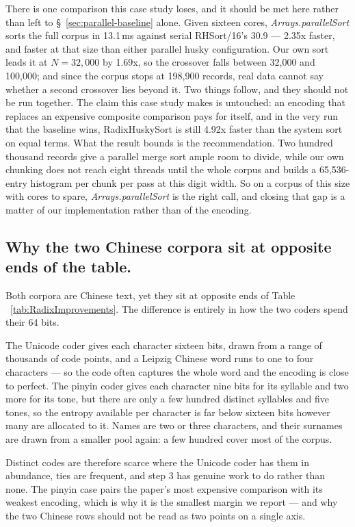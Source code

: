 \documentclass[twoside,leqno,twocolumn]{article}
\begin{document}
There is one comparison this case study loses, and it should be met here rather than left to
\S~\ref{sec:parallel-baseline} alone.
Given sixteen cores, \mbox{\textit{Arrays.parallelSort}} sorts the full corpus in 13.1\,ms against serial
RHSort/16's 30.9 --- 2.35x faster, and faster at that size than either parallel husky configuration.
Our own sort leads it at $N = 32{,}000$ by 1.69x, so the crossover falls between 32,000 and 100,000;
and since the corpus stops at 198,900 records, real data cannot say whether a second crossover lies
beyond it.
Two things follow, and they should not be run together.
The claim this case study makes is untouched: an encoding that replaces an expensive composite
comparison pays for itself, and in the very run that the baseline wins, RadixHuskySort is still 4.92x
faster than the system sort on equal terms.
What the result bounds is the recommendation.
Two hundred thousand records give a parallel merge sort ample room to divide, while our own chunking does
not reach eight threads until the whole corpus and builds a 65,536-entry histogram per chunk per pass at
this digit width.
So on a corpus of this size with cores to spare, \mbox{\textit{Arrays.parallelSort}} is the right call,
and closing that gap is a matter of our implementation rather than of the encoding.

\subsection{Why the two Chinese corpora sit at opposite ends of the table.}
\label{sec:chinese-coders}

Both corpora are Chinese text, yet they sit at opposite ends of Table
~\ref{tab:RadixImprovements}.
The difference is entirely in how the two coders spend their 64 bits.

The Unicode coder gives each character sixteen bits, drawn from a range of thousands of code points,
and a Leipzig Chinese word runs to one to four characters --- so the code often captures the whole word
and the encoding is close to perfect.
The pinyin coder gives each character nine bits for its syllable and two more for its tone, but there
are only a few hundred distinct syllables and five tones, so the entropy available per character is far
below sixteen bits however many are allocated to it.
Names are two or three characters, and their surnames are drawn from a smaller pool again: a few
hundred cover most of the corpus.

Distinct codes are therefore scarce where the Unicode coder has them in abundance, ties are frequent,
and step 3 has genuine work to do rather than none.
The pinyin case pairs the paper's most expensive comparison with its weakest encoding, which is why it
is the smallest margin we report --- and why the two Chinese rows should not be read as two points on a
single axis.
\end{document}
